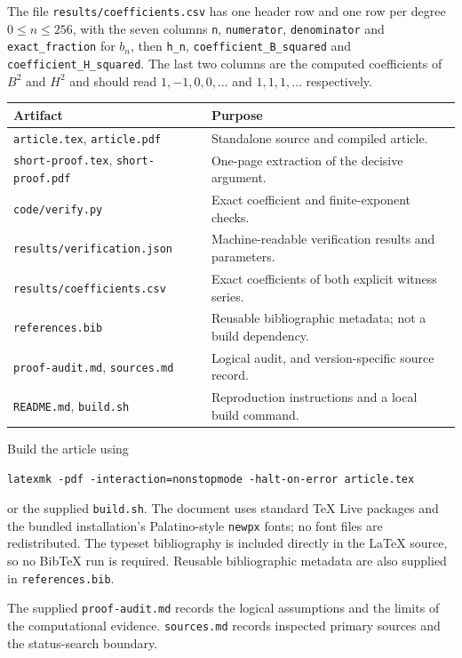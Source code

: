 \documentclass[11pt,letterpaper]{article}
\theoremstyle{definition}
\theoremstyle{remark}
\begin{document}
The file \texttt{results/coefficients.csv} has one header row and one row per
degree $0\le n\le256$, with the seven columns \texttt{n},
\texttt{numerator}, \texttt{denominator} and \texttt{exact\_fraction} for
$b_n$, then \texttt{h\_n}, \texttt{coefficient\_B\_squared} and
\texttt{coefficient\_H\_squared}. The last two columns are the computed
coefficients of $B^2$ and $H^2$ and should read $1,-1,0,0,\ldots$ and
$1,1,1,\ldots$ respectively.

\begin{center}
\begin{tabular}{p{}p{}}
\toprule
Artifact & Purpose\\
\midrule
\texttt{article.tex}, \texttt{article.pdf}
 & Standalone source and compiled article.\\
\texttt{short-proof.tex}, \texttt{short-proof.pdf}
 & One-page extraction of the decisive argument.\\
\texttt{code/verify.py}
 & Exact coefficient and finite-exponent checks.\\
\texttt{results/verification.json}
 & Machine-readable verification results and parameters.\\
\texttt{results/coefficients.csv}
 & Exact coefficients of both explicit witness series.\\
\texttt{references.bib}
 & Reusable bibliographic metadata; not a build dependency.\\
\texttt{proof-audit.md}, \texttt{sources.md}
 & Logical audit, and version-specific source record.\\
\texttt{README.md}, \texttt{build.sh}
 & Reproduction instructions and a local build command.\\
\bottomrule
\end{tabular}
\end{center}

Build the article using
\begin{lstlisting}
latexmk -pdf -interaction=nonstopmode -halt-on-error article.tex
\end{lstlisting}
or the supplied \texttt{build.sh}. The document uses standard TeX Live
packages and the bundled installation's Palatino-style \texttt{newpx} fonts;
no font files are redistributed. The typeset bibliography is included directly in the LaTeX source, so no
BibTeX run is required. Reusable bibliographic metadata are also supplied in
\texttt{references.bib}.

The supplied \texttt{proof-audit.md} records the logical assumptions and the
limits of the computational evidence. \texttt{sources.md} records inspected
primary sources and the status-search boundary.
\end{document}
